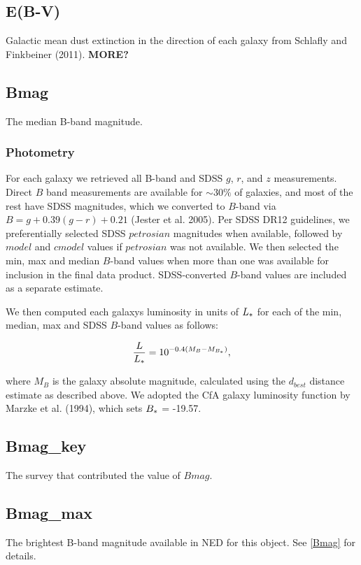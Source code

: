 \documentclass[iop]{emulateapj-rtx4}
\begin{document}
\subsection{E(B-V)}
Galactic mean dust extinction in the direction of each galaxy from Schlafly and Finkbeiner (2011). \textbf{MORE?}

\subsection{Bmag}
The median B-band magnitude.

\subsubsection{Photometry}
For each galaxy we retrieved all B-band and SDSS $g$, $r$, and $z$ measurements. Direct $B$ band measurements are available for $\sim 30\%$ of galaxies, and most of the rest have SDSS magnitudes, which we converted to $B$-band via $B = g + 0.39 (g-r) + 0.21$ (Jester et al. 2005). Per SDSS DR12 guidelines, we preferentially selected SDSS $petrosian$ magnitudes when available, followed by $model$ and $cmodel$ values if $petrosian$ was not available. We then selected the min, max and median $B$-band values when more than one was available for inclusion in the final data product. SDSS-converted $B$-band values are included as a separate estimate. 

We then computed each galaxys luminosity in units of $L_{\**}$ for each of the min, median, max and SDSS $B$-band values as follows:

\begin{equation}
	\frac{L}{L_{\**}} = 10^{-0.4 (M_{B} - M_{B_{\**}})},
	\label{lstar}
\end{equation}

where $M_B$ is the galaxy absolute magnitude, calculated using the $d_{best}$ distance estimate as described above. We adopted the CfA galaxy luminosity function by Marzke et al. (1994), which sets $B_{\**} $ = -19.57. 


\subsection{Bmag\_key}
The survey that contributed the value of $Bmag$.

\subsection{Bmag\_max}
The brightest B-band magnitude available in NED for this object. See \ref{Bmag} for details.
\end{document}
